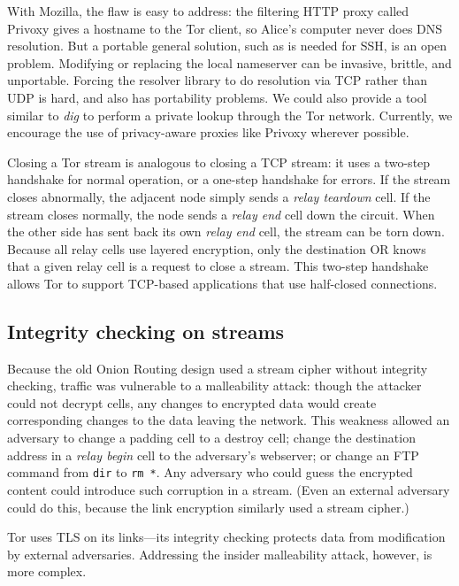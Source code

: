 \documentclass[twocolumn]{article}
\begin{document}
With Mozilla, the flaw is easy to address: the filtering HTTP
proxy called Privoxy gives a hostname to the Tor client, so Alice's
computer never does DNS resolution.
But a portable general solution, such as is needed for
SSH, is
an open problem. Modifying or replacing the local nameserver
can be invasive, brittle, and unportable. Forcing the resolver
library to do resolution via TCP rather than UDP is
hard, and also has portability problems. We could also provide a
tool similar to \emph{dig} to perform a private lookup through the
Tor network. Currently, we encourage the use of
privacy-aware proxies like Privoxy wherever possible.

Closing a Tor stream is analogous to closing a TCP stream: it uses a
two-step handshake for normal operation, or a one-step handshake for
errors. If the stream closes abnormally, the adjacent node simply sends a
\emph{relay teardown} cell. If the stream closes normally, the node sends
a \emph{relay end} cell down the circuit. When the other side has sent
back its own \emph{relay end} cell, the stream can be torn down.  Because
all relay cells use layered encryption, only the destination OR knows
that a given relay cell is a request to close a stream.  This two-step
handshake allows Tor to support TCP-based applications that use half-closed
connections.

\subsection{Integrity checking on streams}
\label{subsec:integrity-checking}

Because the old Onion Routing design used a stream cipher without integrity
checking, traffic was
vulnerable to a malleability attack: though the attacker could not
decrypt cells, any changes to encrypted data
would create corresponding changes to the data leaving the network.
This weakness allowed an adversary to change a padding cell to a destroy
cell; change the destination address in a \emph{relay begin} cell to the
adversary's webserver; or change an FTP command from
{\tt dir} to {\tt rm~*}. Any adversary who could guess the encrypted
content could introduce such corruption in a stream. (Even an external
adversary could do this, because the link encryption similarly used a
stream cipher.)

Tor uses TLS on its links---its integrity checking
protects data from modification by external adversaries.
Addressing the insider malleability attack, however, is
more complex.
\end{document}
